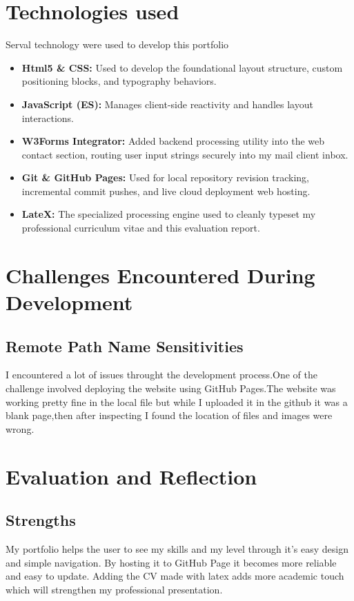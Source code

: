 \documentclass {article}
\begin{document}
\section{Technologies used}
Serval technology were used to develop this portfolio
\begin{itemize}
    \item \textbf{Html5 \& CSS: }Used to develop the foundational layout structure, custom positioning blocks, and typography behaviors.
    \item \textbf{JavaScript (ES):} Manages client-side reactivity and handles layout interactions.
    \item \textbf{W3Forms Integrator:} Added backend processing utility into the web contact section, routing user input strings securely into my mail client inbox.
    \item \textbf{Git \& GitHub Pages:} Used for local repository revision tracking, incremental commit pushes, and live cloud deployment web hosting.
    \item \textbf{LateX:} The specialized processing engine used to cleanly typeset my professional curriculum vitae and this evaluation report.
\end{itemize}
\section{Challenges Encountered During Development}
\subsection{Remote Path Name Sensitivities}
I encountered a lot of issues throught the development process.One of the  challenge involved deploying the website using GitHub Pages.The website was working pretty fine in the local file but while I uploaded it in the github it was a blank page,then after inspecting I found the location of files and images were wrong.

\section{Evaluation and Reflection }
\subsection{Strengths}
My portfolio helps the user to see my skills and my level through it’s easy design and simple navigation. By hosting it to GitHub Page it becomes more reliable and easy to update. Adding the CV made with latex adds more academic touch which will strengthen my professional presentation.
\end{document}
